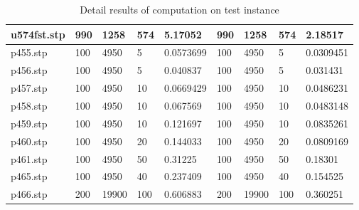 \begin{table}[H]
\begin{center}
\begin{tabular}{|l|l|l|l|l|l|l|l|l|}
     u574fst.stp &  990       &   1258       &   574    &  5.17052      &  990       &   1258       &   574    &  2.18517 \\ \hline
     p455.stp &  100       &   4950       &   5    &    0.0573699      &  100       &   4950       &   5    &    0.0309451 \\ \hline
     p456.stp &  100       &   4950       &   5    &    0.040837      &  100       &   4950       &   5    &    0.031431 \\ \hline
     p457.stp &  100       &   4950       &   10    &    0.0669429      &  100       &   4950       &   10    &    0.0486231 \\ \hline
     p458.stp &  100       &   4950       &   10    &    0.067569      &  100       &   4950       &   10    &    0.0483148 \\ \hline
     p459.stp &  100       &   4950       &   10    &    0.121697      &  100       &   4950       &   10    &    0.0835261 \\ \hline

     p460.stp &  100       &   4950       &   20    &    0.144033      &  100       &   4950       &   20    &    0.0809169 \\ \hline
     p461.stp &  100       &   4950       &   50   &    0.31225      &  100       &   4950       &   50    &    0.18301 \\ \hline
     p465.stp &  100       &   4950       &   40    &    0.237409      &  100       &   4950       &   40    &    0.154525 \\ \hline

     p466.stp &  200       &   19900       &   100    &    0.606883      &  200       &   19900       &   100    &    0.360251 \\ \hline

     

\end{tabular}
\end{center}
\caption{Detail results of computation on test instance}
\end{table}




